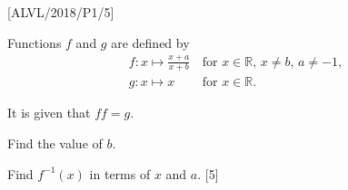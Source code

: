 \item {[}ALVL/2018/P1/5{]}

Functions $f$ and $g$ are defined by 
\begin{align*}
f:x\mapsto\frac{x+a}{x+b} & \,\text{for }x\in\mathbb{R},\,x\neq b,\,a\neq-1,\\
g:x\mapsto x & \,\text{for }x\in\mathbb{R}.
\end{align*}

It is given that $ff=g$. 

Find the value of $b$. 

Find $f^{-1}\left(x\right)$ in terms of $x$ and $a$.\hfill{} {[}5{]}
